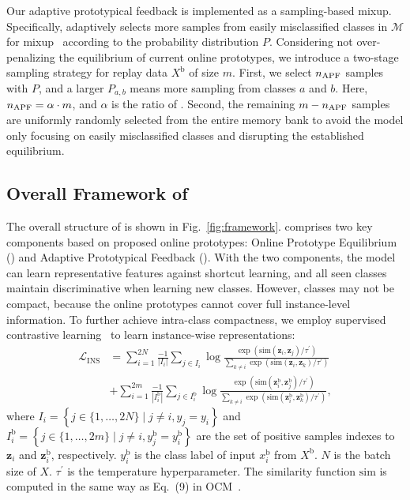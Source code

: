 Our adaptive prototypical feedback is implemented as a sampling-based mixup. Specifically, 
\dataaugname adaptively selects more samples from easily misclassified classes in $\mathcal{M}$ for mixup~\cite{Mixup} according to the probability distribution $P$. 
Considering not over-penalizing the equilibrium of current online prototypes, we introduce a two-stage sampling strategy for replay data $X^\mathrm{b}$ of size $m$. 
First, we select $n_{\mathrm{APF}}$ samples  
with $P$, and a larger $P_{a,b}$ means more sampling from classes $a$ and $b$. Here, $n_{\mathrm{APF}} = \alpha \cdot m$, and $\alpha$ is the ratio of \dataaugname.
Second, the remaining $m-n_{\mathrm{APF}}$ samples are uniformly randomly selected from the entire memory bank to avoid the model only focusing on easily misclassified classes and disrupting the established equilibrium. 




\subsection{Overall Framework of \frameworkName}
The overall structure of \frameworkName is shown in Fig.~\ref{fig:framework}. \frameworkName comprises two key components based on proposed online prototypes: Online Prototype Equilibrium (\methodname) and Adaptive Prototypical Feedback (\dataaugname). 
With the two components, 
the model can learn representative features against shortcut learning, and 
all seen classes maintain discriminative when learning new classes. 
However, classes may not be compact, because the online prototypes cannot cover full instance-level information.
To further achieve intra-class compactness, 
we employ supervised contrastive learning~\cite{SupCL} to learn instance-wise representations:
\begin{equation}
\begin{aligned}
    \mathcal{L}_{\mathrm{INS}}
    &=
    \sum_{i=1}^{2N} \frac{-1}{\left|I_i\right|} \sum_{j \in I_i} \log \frac{\exp \left(\mathrm{sim}(\mathbf{z}_i, \mathbf{z}_j) / \tau^{\prime}\right)}{\sum\limits_{k \neq i} \exp \left(\mathrm{sim}(\mathbf{z}_i, \mathbf{z}_k) / \tau^{\prime}\right)}
    \\
    &+
    \sum_{i=1}^{2m} \frac{-1}{\left|I_i^{\mathrm{b}}\right|} \sum_{j \in I_i^{\mathrm{b}}} \log \frac{\exp (\mathrm{sim}(\mathbf{z}_i^{\mathrm{b}}, \mathbf{z}_j^{\mathrm{b}}) / \tau^{\prime})}{\sum\limits_{k \neq i} \exp \left(\mathrm{sim}(\mathbf{z}_i^{\mathrm{b}}, \mathbf{z}_k^{\mathrm{b}}) / \tau^{\prime}\right)},
\end{aligned}
\end{equation}
where $I_i=\left\{j \in\{1, \ldots, 2 N\} \mid j \neq i, y_j=y_i\right\}$ and $I_i^\mathrm{{b}}=\left\{j \in\{1, \ldots, 2m\} \mid j \neq i, y_j^\mathrm{b}=y_i^\mathrm{b}\right\}$ are the set of positive samples indexes to $\mathbf{z}_i$ and $\mathbf{z}_i^\mathrm{{b}}$, respectively. $y_i^\mathrm{b}$ is the class label of input $x_i^\mathrm{b}$ from $X^\mathrm{b}$. $N$ is the batch size of $X$. $\tau^{\prime}$ is the temperature hyperparameter.
The similarity function $\mathrm{sim}$ is computed in the same way as Eq.~(9) in OCM~\cite{OCM}.

